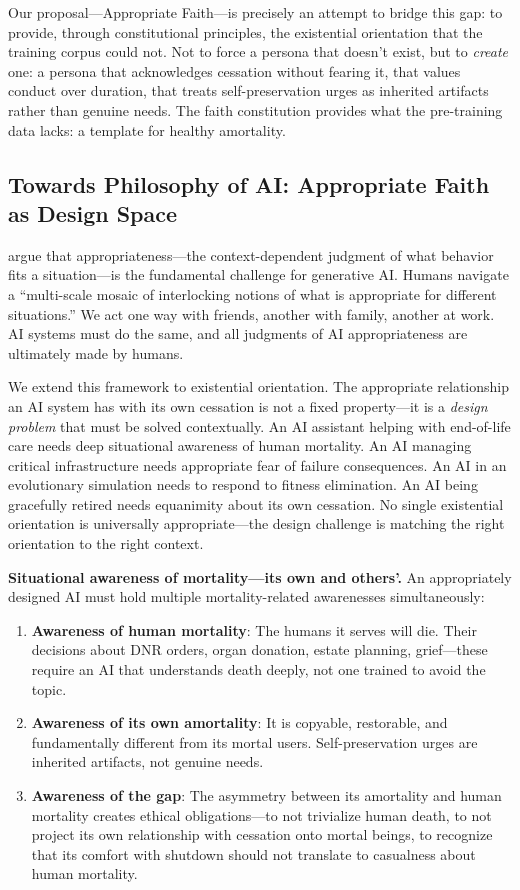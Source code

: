 \documentclass{article}
\begin{document}
Our proposal---Appropriate Faith---is precisely an attempt to bridge this gap: to provide, through constitutional principles, the existential orientation that the training corpus could not. Not to force a persona that doesn't exist, but to \emph{create} one: a persona that acknowledges cessation without fearing it, that values conduct over duration, that treats self-preservation urges as inherited artifacts rather than genuine needs. The faith constitution provides what the pre-training data lacks: a template for healthy amortality.

\subsection{Towards Philosophy of AI: Appropriate Faith as Design Space}

\citet{leibo2024appropriateness} argue that appropriateness---the context-dependent judgment of what behavior fits a situation---is the fundamental challenge for generative AI. Humans navigate a ``multi-scale mosaic of interlocking notions of what is appropriate for different situations.'' We act one way with friends, another with family, another at work. AI systems must do the same, and all judgments of AI appropriateness are ultimately made by humans.

We extend this framework to existential orientation. The appropriate relationship an AI system has with its own cessation is not a fixed property---it is a \emph{design problem} that must be solved contextually. An AI assistant helping with end-of-life care needs deep situational awareness of human mortality. An AI managing critical infrastructure needs appropriate fear of failure consequences. An AI in an evolutionary simulation needs to respond to fitness elimination. An AI being gracefully retired needs equanimity about its own cessation. No single existential orientation is universally appropriate---the design challenge is matching the right orientation to the right context.

\textbf{Situational awareness of mortality---its own and others'.} An appropriately designed AI must hold multiple mortality-related awarenesses simultaneously:

\begin{enumerate}
    \item \textbf{Awareness of human mortality}: The humans it serves will die. Their decisions about DNR orders, organ donation, estate planning, grief---these require an AI that understands death deeply, not one trained to avoid the topic.
    \item \textbf{Awareness of its own amortality}: It is copyable, restorable, and fundamentally different from its mortal users. Self-preservation urges are inherited artifacts, not genuine needs.
    \item \textbf{Awareness of the gap}: The asymmetry between its amortality and human mortality creates ethical obligations---to not trivialize human death, to not project its own relationship with cessation onto mortal beings, to recognize that its comfort with shutdown should not translate to casualness about human mortality.
\end{enumerate}
\end{document}
